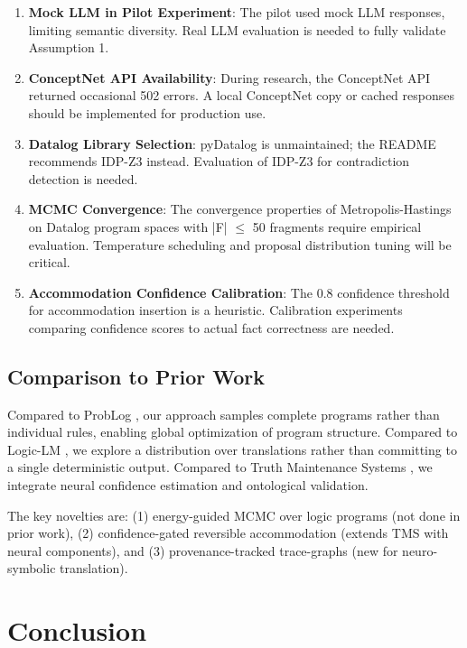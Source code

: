 \documentclass[11pt,letterpaper]{article}
\begin{document}
\begin{enumerate}
  \item \textbf{Mock LLM in Pilot Experiment}: The pilot used mock LLM responses, limiting semantic diversity. Real LLM evaluation is needed to fully validate Assumption 1.
  
  \item \textbf{ConceptNet API Availability}: During research, the ConceptNet API returned occasional 502 errors. A local ConceptNet copy or cached responses should be implemented for production use.
  
  \item \textbf{Datalog Library Selection}: pyDatalog is unmaintained; the README recommends IDP-Z3 instead. Evaluation of IDP-Z3 for contradiction detection is needed.
  
  \item \textbf{MCMC Convergence}: The convergence properties of Metropolis-Hastings on Datalog program spaces with |F| $\leq$ 50 fragments require empirical evaluation. Temperature scheduling and proposal distribution tuning will be critical.
  
  \item \textbf{Accommodation Confidence Calibration}: The 0.8 confidence threshold for accommodation insertion is a heuristic. Calibration experiments comparing confidence scores to actual fact correctness are needed.
\end{enumerate}

\subsection{Comparison to Prior Work}

Compared to ProbLog \cite{DeRaedt2007}, our approach samples complete programs rather than individual rules, enabling global optimization of program structure. Compared to Logic-LM \cite{Pan2023}, we explore a distribution over translations rather than committing to a single deterministic output. Compared to Truth Maintenance Systems \cite{Doyle1979}, we integrate neural confidence estimation and ontological validation.

The key novelties are: (1) energy-guided MCMC over logic programs (not done in prior work), (2) confidence-gated reversible accommodation (extends TMS with neural components), and (3) provenance-tracked trace-graphs (new for neuro-symbolic translation).

\section{Conclusion}
\end{document}
